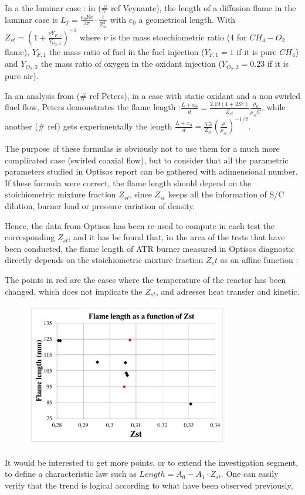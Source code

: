 In a the laminar case : in (\# ref Veynante), the length of a diffusion flame in the laminar case is $L_{f}=\frac{e_{0}Re}{2\pi}\cdot \frac{1}{Z_{st}^2}$  with $e_{0}$ a geometrical length. With  $Z_{st}=(1+\frac{\nu Y_{F,1}}{Y_{O_{2},2}})^{-1}$ where $\nu$ is the mass stoechiometric ratio (4 for $CH_{4}-O_{2}$ flame),    $Y_{F,1}$ the mass ratio of fuel in the fuel injection ($Y_{F,1}=1$ if it is pure $CH_{4}$) and $Y_{O_{2},2}$ the mass ratio of oxygen in the oxidant injection ($Y_{O_{2},2}=0.23$ if it is pure air). 

In an analysis from (\# ref Peters), in a case with static oxidant and a non swirled fluel flow, Peters demonstrates the flame length :$\frac{L+x_{0}}{d}=\frac{2.19 (1+2Sc)}{Z_{st}}\frac{\rho_{0}}{\rho_{st}C}$, while another (\# ref) gets experimentally the length  $\frac{L+x_{0}}{d}=\frac{5.3}{Z_{st}}(\frac{\rho}{\rho_{st}})^{-1/2}$.

The purpose of these formulas is obviously not to use them for a much more complicated case (swirled coaxial flow), but to consider that all the parametric parameters studied in Optisos report can be gathered with adimensional number. If these formula were correct, the flame length should depend on the stoichiometric mixture fraction $Z_{st}$, since $Z_{st}$ keeps all the information of S/C dilution, burner load or pressure variation of density.

Hence, the data from Optisos has been re-used to compute in each test the corresponding $Z_{st}$, and it has be found that, in the area of the tests that have been conducted, the flame length of ATR burner measured in Optisos diagnostic directly depends on the stoichiometric mixture fraction $Z_st$ as an affine function :

The points in red are the cases where the temperature of the reactor has been changed, which does not implicate the $Z_{st}$, and adresses heat transfer and kinetic.

\begin{figure}[h!]
  \centering
\includegraphics[width=0.8\textwidth]{fig/Flame_length_Zst.pdf}
 \label{Flame length as a function of Zst}
\end{figure}

It would be interested to get more points, or to extend the investigation segment, to define a characteristic law such as $Length=A_{0}-A_{1}\cdot Z_{st}$. One can easily verify that the trend is logical according to what have been observed previously, 